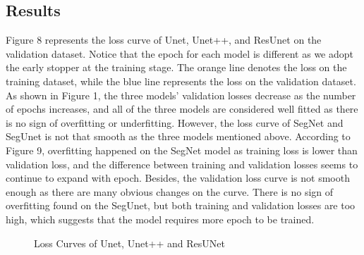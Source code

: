 \documentclass{article}
\begin{document}
\subsection{Results}
Figure 8 represents the loss curve of Unet, Unet++, and ResUnet on the validation dataset. Notice that the epoch for each model is different as we adopt the early stopper at the training stage. The orange line denotes the loss on the training dataset, while the blue line represents the loss on the validation dataset. As shown in Figure 1, the three models' validation losses decrease as the number of epochs increases, and all of the three models are considered well fitted as there is no sign of overfitting or underfitting. However, the loss curve of SegNet and SegUnet is not that smooth as the three models mentioned above.
According to Figure 9, overfitting happened on the SegNet model as training loss is lower than validation loss, and the difference between training and validation losses seems to continue to expand with epoch. Besides, the validation loss curve is not smooth enough as there are many obvious changes on the curve. There is no sign of overfitting found on the SegUnet, but both training and validation losses are too high, which suggests that the model requires more epoch to be trained.

\begin{figure}[H]
    \caption{Loss Curves of Unet, Unet++ and ResUNet}
\end{figure}
\end{document}
